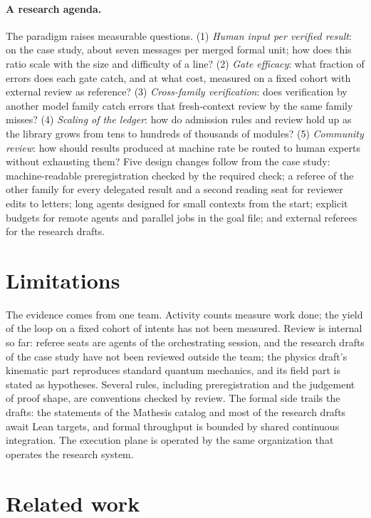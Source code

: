 \documentclass[11pt]{article}
\begin{document}
\paragraph{A research agenda.} The paradigm raises measurable questions.
(1) \emph{Human input per verified result}: on the case study, about seven
messages per merged formal unit; how does this ratio scale with the size and
difficulty of a line? (2) \emph{Gate efficacy}: what fraction of errors does
each gate catch, and at what cost, measured on a fixed cohort with external
review as reference? (3) \emph{Cross-family verification}: does verification
by another model family catch errors that fresh-context review by the same
family misses? (4) \emph{Scaling of the ledger}: how do admission rules and
review hold up as the library grows from tens to hundreds of thousands of
modules? (5) \emph{Community review}: how should results produced at machine
rate be routed to human experts without exhausting them? Five design changes
follow from the case study: machine-readable preregistration checked by the
required check; a referee of the other family for every delegated result and
a second reading seat for reviewer edits to letters; long agents designed
for small contexts from the start; explicit budgets for remote agents and
parallel jobs in the goal file; and external referees for the research
drafts.

\section{Limitations}
\label{sec:limits}
The evidence comes from one team. Activity counts measure work done; the
yield of the loop on a fixed cohort of intents has not been measured. Review
is internal so far: referee seats are agents of the orchestrating session,
and the research drafts of the case study have not been reviewed outside
the team; the physics draft's kinematic part reproduces standard quantum
mechanics, and its field part is stated as hypotheses. Several rules,
including preregistration and the judgement of proof shape, are conventions
checked by review. The formal side trails the drafts: the statements of the
Mathesis catalog and most of the research drafts await Lean targets, and
formal throughput is bounded by shared continuous integration. The execution
plane is operated by the same organization that operates the
research system.

\section{Related work}
\label{sec:related}
\end{document}
